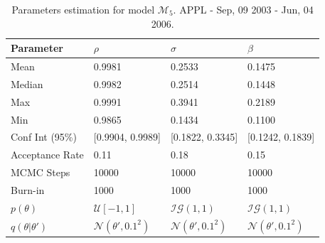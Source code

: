 \documentclass[11pt,a4,twosided,singlespacing,titlepagenumber=on]{scrreprt}
\numberwithin{equation}{chapter} %
\theoremstyle{remark}
\begin{document}
\begin{table}[H]
\centering
\begin{tabular}{llll}
Parameter      	& $\rho$ & $\sigma$ & $\beta$ \\ 
\hline
Mean            & 0.9981              & 0.2533             & 0.1475\\
Median          & 0.9982              & 0.2514             & 0.1448\\
Max             & 0.9991              & 0.3941             & 0.2189\\
Min             & 0.9865              & 0.1434             & 0.1100\\
Conf Int (95\%) & [0.9904, 0.9989]    & [0.1822, 0.3345]   & [0.1242, 0.1839]\\
Acceptance Rate & 0.11                & 0.18               & 0.15 \\
MCMC Steps      & 10000               & 10000              & 10000 \\
Burn-in         & 1000                & 1000               & 1000 \\
$p(\theta)$     & $\mathcal{U}[-1,1]$   & $\mathcal{IG}(1,1)$  & $\mathcal{IG}(1,1)$     \\
$q(\theta|\theta')$& $\mathcal{N}(\theta', 0.1^2)$ & $\mathcal{N}(\theta', 0.1^2)$ & $\mathcal{N}(\theta', 0.1^2)$     \\
\hline
\end{tabular}
\caption{Parameters estimation for model $\mathcal{M}_5$. APPL - Sep, 09 2003 - Jun, 04 2006.}
\label{est_appl_params}
\end{table}
\end{document}
